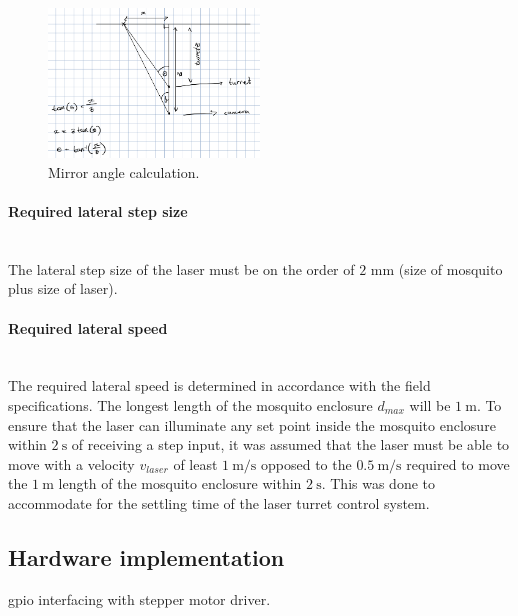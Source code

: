 \begin{figure}[h]
    \centering
    \includegraphics[width=0.5\textwidth]{figures/hardware_design/mirror_angle.png}
    \caption{Mirror angle calculation.}
    \label{fig:mirror_angle}
\end{figure}





\paragraph{Required lateral step size}\mbox{}\\
\newcommand{\requiredLatStepSizeMM}{2} %
The lateral step size of the laser must be on the order of $\requiredLatStepSizeMM$ mm (size of mosquito plus size of laser).


\paragraph{Required lateral speed}\mbox{}\\
\newcommand{\requiredLatSpeedMPS}{1} %
The required lateral speed is determined in accordance with the field specifications. The longest length of the mosquito enclosure $d_{max}$ will be $\SI{1}{\meter}$. To ensure that the laser can illuminate any set point inside the mosquito enclosure within $\SI{2}{\second}$ of receiving a step input, it was assumed that the laser must be able to move with a velocity $v_{laser}$ of least $\SI{\requiredLatSpeedMPS}{\meter\per\second}$ opposed to the $\SI{0.5}{\meter\per\second}$ required to move the $\SI{1}{\meter}$ length of the mosquito enclosure within $\SI{2}{\second}$. This was done to accommodate for the settling time of the laser turret control system.



\subsection{Hardware implementation}
\gls{gpio} interfacing with stepper motor driver.



